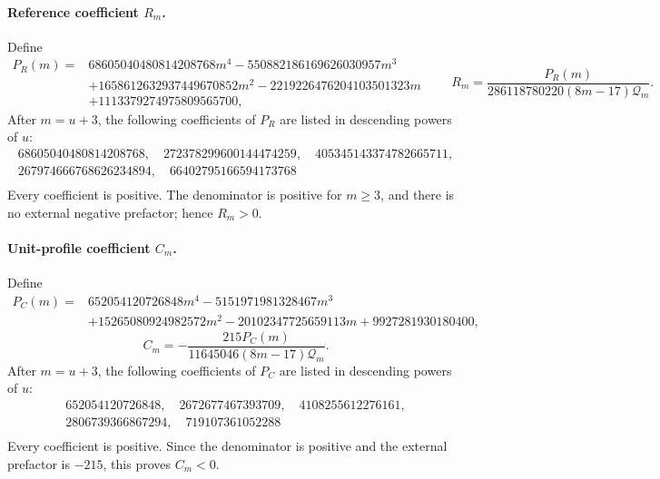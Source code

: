 \paragraph{Reference coefficient $R_m$.} Define
\[
\begin{split}
 P_R(m)={}&68605040480814208768m^4
 -550882186169626030957m^3\\
 &+1658612632937449670852m^2
 -2219226476204103501323m\\
 &+1113379274975809565700,
\end{split}
\qquad
 R_m=\frac{P_R(m)}{286118780220(8m-17)\mathcal Q_m}.
\]
After $m=u+3$, the following coefficients of $P_R$ are listed in descending
powers of $u$:
\[
\begin{gathered}
68605040480814208768,\quad 272378299600144474259,\quad 405345143374782665711,\\
267974666768626234894,\quad 66402795166594173768\\
\end{gathered}
\]\noindent Every coefficient is positive.  The denominator is positive
for $m\ge3$, and there is no external negative prefactor; hence $R_m>0$.

\paragraph{Unit-profile coefficient $C_m$.} Define
\[
\begin{split}
 P_C(m)={}&652054120726848m^4-5151971981328467m^3\\
 &+15265080924982572m^2-20102347725659113m
 +9927281930180400,
\end{split}
\]
\[
 C_m=-\frac{215P_C(m)}{11645046(8m-17)\mathcal Q_m}.
\]
After $m=u+3$, the following coefficients of $P_C$ are listed in descending
powers of $u$:
\[
\begin{gathered}
652054120726848,\quad 2672677467393709,\quad 4108255612276161,\\
2806739366867294,\quad 719107361052288\\
\end{gathered}
\]\noindent Every coefficient is positive.  Since the denominator is
positive and the external prefactor is $-215$, this proves $C_m<0$.

